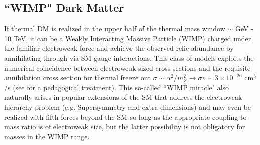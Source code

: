 \documentclass{article}
\begin{document}
\subsection{``WIMP" Dark Matter}
If thermal DM is realized in the upper half of the thermal mass window $\sim$ GeV - 10 TeV, it can be a Weakly Interacting Massive Particle (WIMP) charged under the 
familiar electroweak force and achieve the observed
relic abundance by annihilating through via SM gauge interactions.  This class of models exploits the numerical
 coincidence between electroweak-sized cross sections and the requisite annihilation cross section for thermal freeze out $\sigma \sim \alpha^2 /m_Z^2  \to \sigma v \sim 3 \times 10^{-26}$ cm$^3$/s (see \cite{Kolb:1990vq} for a pedagogical treatment). This so-called ``WIMP miracle" also naturally arises in popular extensions of the SM that address the electroweak hierarchy problem 
(e.g. Supersymmetry and extra dimensions) and may even be realized with fifth forces beyond the SM so long as the appropriate coupling-to-mass
ratio is of electroweak size, but the latter possibility is not obligatory for masses in the WIMP range.  
\end{document}

